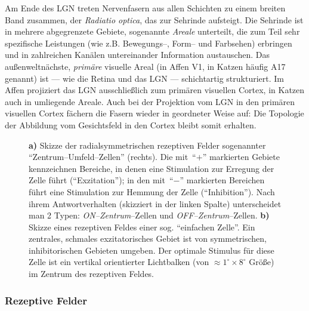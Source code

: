 Am Ende des LGN treten Nervenfasern aus allen Schichten zu einem breiten
Band zusammen, der \emph{Radiatio optica}, das zur Sehrinde aufsteigt. Die
Sehrinde ist in mehrere abgegrenzete Gebiete, sogenannte \emph{Areale}
unterteilt, die zum Teil sehr spezifische Leistungen (wie z.B.
Bewegungs--, Form-- und Farbsehen) erbringen und in zahlreichen Kanälen
untereinander Information austauschen. Das außenweltnächste,
\emph{primäre} visuelle Areal (in Affen V1, in Katzen häufig A17 genannt)
ist --- wie die Retina und das LGN --- schichtartig strukturiert. Im Affen
projiziert das LGN ausschließlich zum primären visuellen Cortex, in
Katzen auch in umliegende Areale. Auch bei der Projektion vom LGN in den
primären visuellen Cortex fächern die Fasern wieder in geordneter Weise
auf: Die Topologie der Abbildung vom Gesichtsfeld in den Cortex bleibt
somit erhalten.

\begin{figure}[t]
    \centering
    \begin{minipage}[m]{5cm}
    \end{minipage}
    \hskip1cm
    \begin{minipage}[m]{6cm}
    \end{minipage}
    \caption{\textbf{a)} Skizze der radialsymmetrischen rezeptiven Felder
    sogenannter ``Zentrum--Umfeld--Zellen'' (rechts). Die mit~``$+$''
    markierten Gebiete kennzeichnen Bereiche, in denen eine Stimulation zur
    Erregung der Zelle führt (``Exzitation''); in den mit~``$-$'' markierten
    Bereichen führt eine Stimulation zur Hemmung der Zelle
        (``Inhibition''). Nach ihrem Antwortverhalten (skizziert in der linken
        Spalte) unterscheidet man 2 Typen: \emph{ON--Zentrum}--Zellen und
        \emph{OFF--Zentrum}--Zellen. \textbf{b)} Skizze eines rezeptiven Feldes
        einer sog. ``einfachen Zelle''. Ein zentrales, schmales exzitatorisches
        Gebiet ist von symmetrischen, inhibitorischen Gebieten umgeben. Der
        optimale Stimulus für diese Zelle ist ein vertikal orientierter
        Lichtbalken (von $\approx1^\circ\times 8^\circ$ Größe) im Zentrum des
        rezeptiven Feldes.}
    \label{rfsimple}
\end{figure}

\subsubsection{Rezeptive Felder}
\label{rf}

